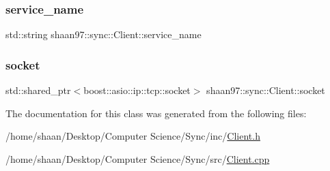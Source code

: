 \subsubsection{\texorpdfstring{service\+\_\+name}{service\_name}}
{\footnotesize\ttfamily std\+::string shaan97\+::sync\+::\+Client\+::service\+\_\+name\hspace{0.3cm}{\ttfamily [private]}}

\mbox{\label{classshaan97_1_1sync_1_1_client_a55bfc26c9a8e09b61c9075198abd52a6}} 
\subsubsection{\texorpdfstring{socket}{socket}}
{\footnotesize\ttfamily std\+::shared\+\_\+ptr$<$boost\+::asio\+::ip\+::tcp\+::socket$>$ shaan97\+::sync\+::\+Client\+::socket\hspace{0.3cm}{\ttfamily [private]}}



The documentation for this class was generated from the following files\+:\begin{DoxyCompactItemize}
\item 
/home/shaan/\+Desktop/\+Computer Science/\+Sync/inc/\hyperlink{_client_8h}{Client.\+h}\item 
/home/shaan/\+Desktop/\+Computer Science/\+Sync/src/\hyperlink{_client_8cpp}{Client.\+cpp}\end{DoxyCompactItemize}
